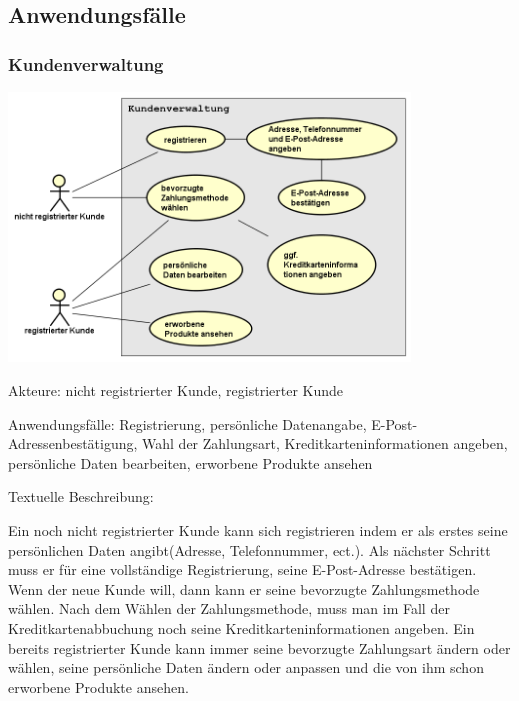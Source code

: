 \documentclass[parskip=full]{scrartcl}
\begin{document}
\subsection{Anwendungsfälle}
\subsubsection{\gls{Kunde}nverwaltung}
\begin{center}
\includegraphics[width=0.8\textwidth]{szenario_kundenverwaltung.png}
\end{center}

Akteure: nicht registrierter \gls{Kunde}, registrierter \gls{Kunde}

Anwendungsfälle: Registrierung, persönliche Datenangabe, E-Post-Adressenbestätigung, Wahl der Zahlungsart, Kreditkarteninformationen angeben, persönliche Daten bearbeiten, erworbene Produkte ansehen 

Textuelle Beschreibung:

Ein noch nicht registrierter \gls{Kunde} kann sich registrieren indem er als erstes seine persönlichen Daten angibt(Adresse, Telefonnummer, ect.). Als nächster Schritt muss er für eine vollständige Registrierung, seine E-Post-Adresse bestätigen. Wenn der neue \gls{Kunde} will, dann kann er seine bevorzugte Zahlungsmethode wählen. Nach dem Wählen der Zahlungsmethode, muss man im Fall der Kreditkartenabbuchung noch seine Kreditkarteninformationen angeben.
Ein bereits registrierter \gls{Kunde} kann immer seine bevorzugte Zahlungsart ändern oder wählen, seine persönliche Daten ändern oder anpassen und die von ihm schon erworbene Produkte ansehen. 


%
%
\printglossaries
\end{document}
